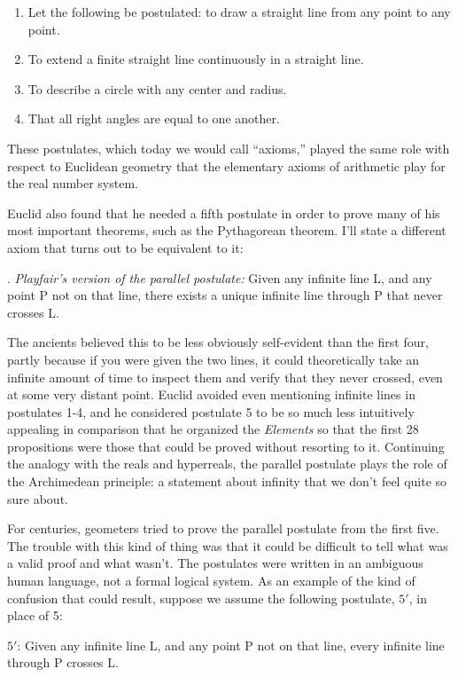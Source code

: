 \begin{enumerate}
\item Let the following be postulated: to draw a straight line from any point to any point.
\item To extend a finite straight line continuously in a straight line.
\item To describe a circle with any center and radius.
\item That all right angles are equal to one another.
\end{enumerate}

These postulates, which today we would call ``axioms,'' played the same role with respect to Euclidean geometry that the elementary axioms of arithmetic
play for the real number system.

Euclid also found that he needed a fifth postulate in order to prove many of his most important
theorems, such as the Pythagorean theorem. I'll state a different axiom that turns out to be
equivalent to it:

. \emph{Playfair's version of the parallel postulate:} Given any infinite line L, and any point P not on that line,
there exists a unique infinite line through P that never crosses L.

The ancients believed this to be less obviously self-evident than the first four, partly because
if you were given the two lines, it could theoretically take an infinite amount of time to inspect
them and verify that they never crossed, even at some very distant point. Euclid avoided even mentioning
infinite lines in postulates 1-4, and he considered postulate 5 to be so much less intuitively appealing in comparison that
he organized the \emph{Elements} so that the first 28 propositions were those that could be proved
without resorting to it. Continuing the analogy with the reals and hyperreals, the parallel postulate
plays the role of the Archimedean principle: a statement about infinity that we don't feel quite so sure about.

For centuries, geometers tried to prove the parallel postulate from the first five. The trouble with
this kind of thing was that it could be difficult to tell what was a valid proof and what wasn't.
The postulates were written in an ambiguous human language, not a formal logical system.
As an example of the kind of confusion that could result,
suppose we assume the following postulate, $5'$, in place of 5:

\qquad $5'$: Given any infinite line L, and any point P not on that line,
every infinite line through P crosses L.

